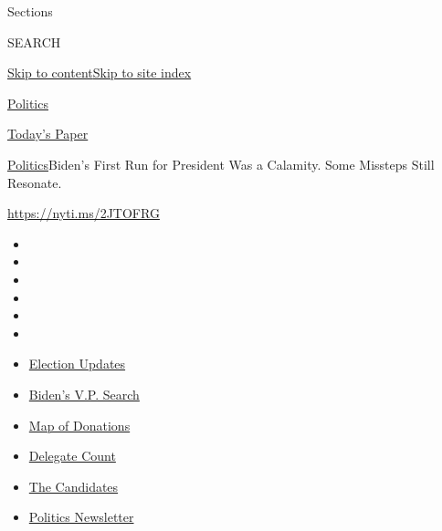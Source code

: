 Sections

SEARCH

\protect\hyperlink{site-content}{Skip to
content}\protect\hyperlink{site-index}{Skip to site index}

\href{https://www.nytimes.com/section/politics}{Politics}

\href{https://myaccount.nytimes.com/auth/login?response_type=cookie\&client_id=vi}{}

\href{https://www.nytimes.com/section/todayspaper}{Today's Paper}

\href{/section/politics}{Politics}\textbar{}Biden's First Run for
President Was a Calamity. Some Missteps Still Resonate.

\url{https://nyti.ms/2JTOFRG}

\begin{itemize}
\item
\item
\item
\item
\item
\item
\end{itemize}

\begin{itemize}
\item
  \href{https://www.nytimes.com/2020/07/31/us/elections/biden-vs-trump.html?action=click\&pgtype=Article\&state=default\&region=TOP_BANNER\&context=storylines_menu}{Election
  Updates}
\item
  \href{https://www.nytimes.com/article/biden-vice-president-2020.html?action=click\&pgtype=Article\&state=default\&region=TOP_BANNER\&context=storylines_menu}{Biden's
  V.P. Search}
\item
  \href{https://www.nytimes.com/interactive/2020/07/24/us/politics/trump-biden-campaign-donors.html?action=click\&pgtype=Article\&state=default\&region=TOP_BANNER\&context=storylines_menu}{Map
  of Donations}
\item
  \href{https://www.nytimes.com/interactive/2020/us/elections/delegate-count-primary-results.html?action=click\&pgtype=Article\&state=default\&region=TOP_BANNER\&context=storylines_menu}{Delegate
  Count}
\item
  \href{https://www.nytimes.com/interactive/2019/us/politics/2020-presidential-candidates.html?action=click\&pgtype=Article\&state=default\&region=TOP_BANNER\&context=storylines_menu}{The
  Candidates}
\item
  \href{https://www.nytimes.com/newsletters/politics?action=click\&pgtype=Article\&state=default\&region=TOP_BANNER\&context=storylines_menu}{Politics
  Newsletter}
\end{itemize}

